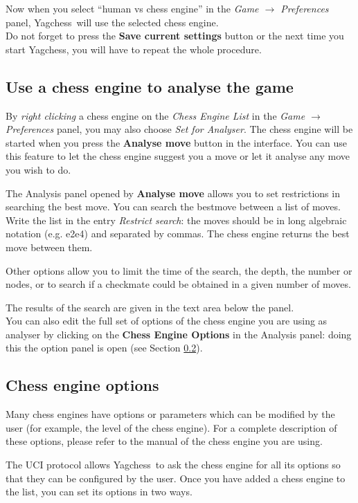 \documentclass[a4paper]{article}
\newcommand{\nameprog}{Yagchess}
\begin{document}
Now when you select ``human vs chess engine'' in the \textit{Game $\rightarrow$ Preferences} panel, \nameprog\ will use the selected chess engine.\\

Do not forget to press the \textbf{Save current settings} button or the next time you start \nameprog, you will have to repeat the whole procedure.


\subsection{Use a chess engine to analyse the game}
\label{howce:analys}
By \textit{right clicking} a chess engine on the \textit{Chess Engine List} in the \textit{Game $\rightarrow$ Preferences} panel, you may also choose
\textit{Set for Analyser}. The chess engine will be started when you press the \textbf{Analyse move} button in the interface. You can use this feature to let the chess engine
suggest you a move or let it analyse any move you wish to do.

The Analysis panel opened by \textbf{Analyse move} allows you to set restrictions in searching the best move. You can search the bestmove between a list of moves. Write the list
in the entry \textit{Restrict search}: the moves should be in long algebraic notation (e.g. e2e4) and separated by commas. The chess engine returns the best move
between them.

Other options allow you to limit the time of the search, the depth, the number or nodes, or to search if a checkmate could be obtained in a given number of moves.

The results of the search are given in the text area below the panel.\\

You can also edit the full set of options of the chess engine you are using as analyser by clicking on the \textbf{Chess Engine Options} in the Analysis panel: doing this
the option panel is open (see Section \ref{howce:opt}).


\subsection{Chess engine options}
\label{howce:opt}
Many chess engines have options or parameters which can be modified by the user (for example, the level of the chess engine). For a complete description of these options,
please refer to the manual of the chess engine you are using.

The UCI protocol allows \nameprog\ to ask the chess engine for all its options so that they can be configured by the user. Once you have added a chess engine to the list, 
you can set its options in two ways.
\end{document}
